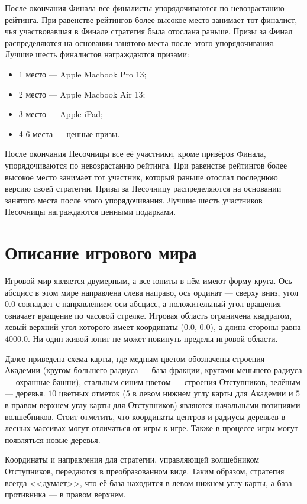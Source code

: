 После окончания Финала все финалисты упорядочиваются по невозрастанию рейтинга. При равенстве рейтингов более высокое место занимает тот
финалист, чья участвовавшая в Финале стратегия была отослана раньше. Призы за Финал распределяются на основании занятого места после этого
упорядочивания. Лучшие шесть финалистов награждаются призами:
\begin{itemize}
\item 1 место --- Apple Macbook Pro 13\textquotedbl;
\item 2 место --- Apple Macbook Air 13\textquotedbl;
\item 3 место --- Apple iPad;
\item 4-6 места --- ценные призы.
\end{itemize}

После окончания Песочницы все её участники, кроме призёров Финала, упорядочиваются по невозрастанию рейтинга. При равенстве рейтингов более
высокое место занимает тот участник, который раньше отослал последнюю версию своей стратегии. Призы за Песочницу распределяются на основании
занятого места после этого упорядочивания. Лучшие шесть участников Песочницы награждаются ценными подарками.

\section{Описание игрового мира}

Игровой мир является двумерным, а все юниты в нём имеют форму круга. Ось абсцисс в этом мире направлена слева направо, ось ординат ---
сверху вниз, угол $0.0$ совпадает с направлением оси абсцисс, а положительный угол вращения означает вращение по часовой стрелке. Игровая
область ограничена квадратом, левый верхний угол которого имеет координаты ($0.0$, $0.0$), а длина стороны равна $4000.0$. Ни один живой
юнит не может покинуть пределы игровой области.

\newpage
Далее приведена схема карты, где медным цветом обозначены строения Академии (кругом большего радиуса --- база фракции, кругами меньшего
радиуса --- охранные башни), стальным синим цветом --- строения Отступников, зелёным --- деревья. $10$ цветных отметок ($5$ в левом нижнем
углу карты для Академии и $5$ в правом верхнем углу карты для Отступников) являются начальными позициями волшебников. Стоит отметить, что
координаты центров и радиусы деревьев в лесных массивах могут отличаться от игры к игре. Также в процессе игры могут появляться новые
деревья.

Координаты и направления для стратегии, управляющей волшебником Отступников, передаются в преобразованном виде. Таким образом, стратегия
всегда <<думает>>, что её база находится в левом нижнем углу карты, а база противника --- в правом верхнем.

